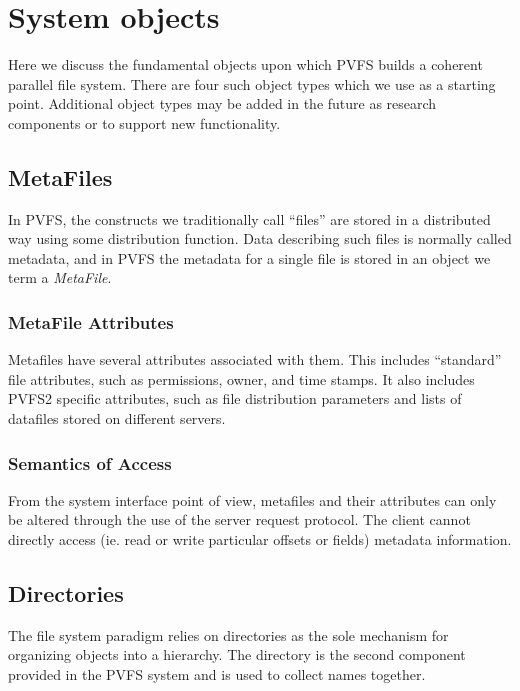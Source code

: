 \documentclass[11pt, letterpaper]{article}
\begin{document}
\section{System objects}

Here we discuss the fundamental objects upon which PVFS builds a coherent
parallel file system.  There are four such object types which we use as
a starting point.  Additional object types may be added in the future as
research components or to support new functionality.

%
%
\subsection{MetaFiles}

In PVFS, the constructs we traditionally call ``files'' are stored in a
distributed way using some distribution function.  Data describing such
files is normally called metadata, and in PVFS the metadata for a single
file is stored in an object we term a {\em MetaFile}.

\subsubsection{MetaFile Attributes}

Metafiles have several attributes associated with them.  This includes
``standard'' file attributes, such as permissions, owner, and time
stamps.  It also includes PVFS2 specific attributes, such as file
distribution parameters and lists of datafiles stored on different
servers.

\subsubsection{Semantics of Access}

From the system interface point of view, metafiles and their attributes
can only be altered through the use of the server request protocol.  The
client cannot directly access (ie. read or write particular offsets or
fields) metadata information.

%
%
\subsection{Directories}

The file system paradigm relies on directories as the sole mechanism for
organizing objects into a hierarchy.  The directory is the second
component provided in the PVFS system and is used to collect names
together.
\end{document}
